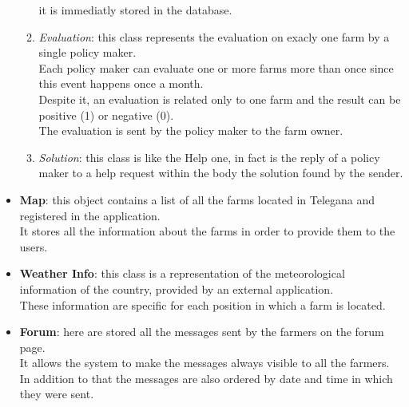 \begin{itemize}
\begin{enumerate}
             it is immediatly stored in the database.
            \item \textsl{Evaluation}: this class represents the evaluation on exacly one farm by a single policy maker.\\ Each policy maker can evaluate one or more 
            farms more than once since this event happens once a month.\\ Despite it, an evaluation is related only to one farm and the result can be positive (1) or negative (0).\\ The evaluation is sent by the policy maker to the farm owner.
            \item \textsl{Solution}: this class is like the Help one, in fact is the reply of a policy maker to a help request within the body the solution found by the sender.
        \end{enumerate}
    
    \item \textbf{Map}: this object contains a list of all the farms located in Telegana and registered in the application.\\It stores all the information about the farms in order to provide them to the users.
    \item \textbf{Weather Info}: this class is a representation of the meteorological information of the country, provided by an external application.\\These information are specific for each position in which a farm is located.
    
    \item \textbf{Forum}: here are stored all the messages sent by the farmers on the forum page.\\ It allows the system to make the messages always visible to all the farmers.\\ In addition to that the messages are also ordered by date and time in which they were sent.
    
\end{itemize}
